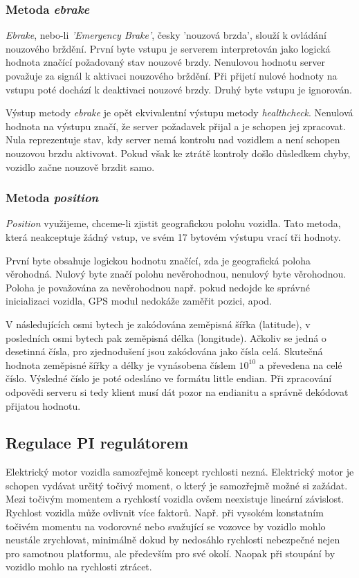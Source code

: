 \documentclass[czech,bachelor,dept460,male,cpp,cpdeclaration]{diploma}
\begin{document}
\subsubsection{Metoda \emph{ebrake}}
\emph{Ebrake}, nebo-li \emph{'Emergency Brake'}, česky 'nouzová brzda', slouží k ovládání nouzového brždění. První byte vstupu
je serverem interpretován jako logická hodnota značící požadovaný stav nouzové brzdy. Nenulovou hodnotu server považuje za signál
k aktivaci nouzového brždění. Při přijetí nulové hodnoty na vstupu poté dochází k deaktivaci nouzové brzdy. Druhý byte vstupu 
je ignorován.

Výstup metody \emph{ebrake} je opět ekvivalentní výstupu metody \emph{healthcheck}. Nenulová hodnota na výstupu značí, že server
požadavek přijal a je schopen jej zpracovat. Nula reprezentuje stav, kdy server nemá kontrolu nad vozidlem a není schopen 
nouzovou brzdu aktivovat. Pokud však ke ztrátě kontroly došlo důsledkem chyby, vozidlo začne nouzově brzdit samo.

\subsubsection{Metoda \emph{position}}

\emph{Position} využijeme, chceme-li zjistit geografickou polohu vozidla. Tato metoda, která neakceptuje žádný vstup, ve svém 
17 bytovém výstupu vrací tři hodnoty. 

První byte obsahuje logickou hodnotu značící, zda je geografická poloha věrohodná. Nulový byte značí polohu nevěrohodnou, 
nenulový byte věrohodnou. Poloha je považována za nevěrohodnou např. pokud nedojde ke správné inicializaci vozidla, GPS modul 
nedokáže zaměřit pozici, apod. 

V následujících osmi bytech je zakódována zeměpisná šířka (latitude), v posledních osmi bytech pak zeměpisná délka (longitude). 
Ačkoliv se jedná o desetinná čísla, pro zjednodušení jsou zakódována jako čísla celá. Skutečná hodnota zeměpisné šířky a délky 
je vynásobena číslem $10^{10}$ a převedena na celé číslo. Výsledné číslo je poté odesláno ve formátu little endian. Při zpracování
odpovědi serveru si tedy klient musí dát pozor na endianitu a správně dekódovat přijatou hodnotu.

\subsection{Regulace PI regulátorem}
Elektrický motor vozidla samozřejmě koncept rychlosti nezná. Elektrický motor je schopen vydávat určitý točivý moment, o který
je samozřejmě možné si zažádat. Mezi točivým momentem a rychlostí vozidla ovšem neexistuje lineární závislost. Rychlost vozidla
může ovlivnit více faktorů. Např. při vysokém konstatním točivém momentu na vodorovné nebo svažující se vozovce by vozidlo mohlo 
neustále zrychlovat, minimálně dokud by nedosáhlo rychlosti nebezpečné nejen pro samotnou platformu, ale především pro své okolí. 
Naopak při stoupání by vozidlo mohlo na rychlosti ztrácet.
\end{document}
